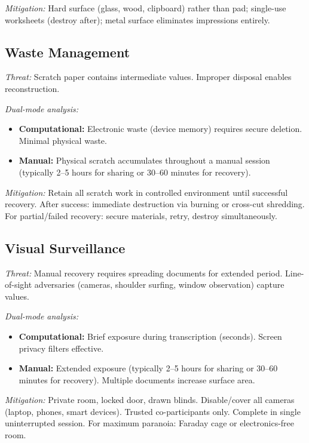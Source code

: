 \documentclass[11pt]{article}
\begin{document}
\textit{Mitigation:} Hard surface (glass, wood, clipboard) rather than pad; single-use worksheets (destroy after); metal surface eliminates impressions entirely.

\subsection{Waste Management}

\textit{Threat:} Scratch paper contains intermediate values. Improper disposal enables reconstruction.

\textit{Dual-mode analysis:}
\begin{itemize}[noitemsep]
    \item \textbf{Computational:} Electronic waste (device memory) requires secure deletion. Minimal physical waste.
    \item \textbf{Manual:} Physical scratch accumulates throughout a manual session (typically 2--5 hours for sharing or 30--60 minutes for recovery).
\end{itemize}

\textit{Mitigation:} Retain all scratch work in controlled environment until successful recovery. After success: immediate destruction via burning or cross-cut shredding. For partial/failed recovery: secure materials, retry, destroy simultaneously.

\subsection{Visual Surveillance}

\textit{Threat:} Manual recovery requires spreading documents for extended period. Line-of-sight adversaries (cameras, shoulder surfing, window observation) capture values.

\textit{Dual-mode analysis:}
\begin{itemize}[noitemsep]
    \item \textbf{Computational:} Brief exposure during transcription (seconds). Screen privacy filters effective.
    \item \textbf{Manual:} Extended exposure (typically 2--5 hours for sharing or 30--60 minutes for recovery). Multiple documents increase surface area.
\end{itemize}

\textit{Mitigation:} Private room, locked door, drawn blinds. Disable/cover all cameras (laptop, phones, smart devices). Trusted co-participants only. Complete in single uninterrupted session. For maximum paranoia: Faraday cage or electronics-free room.
\end{document}
